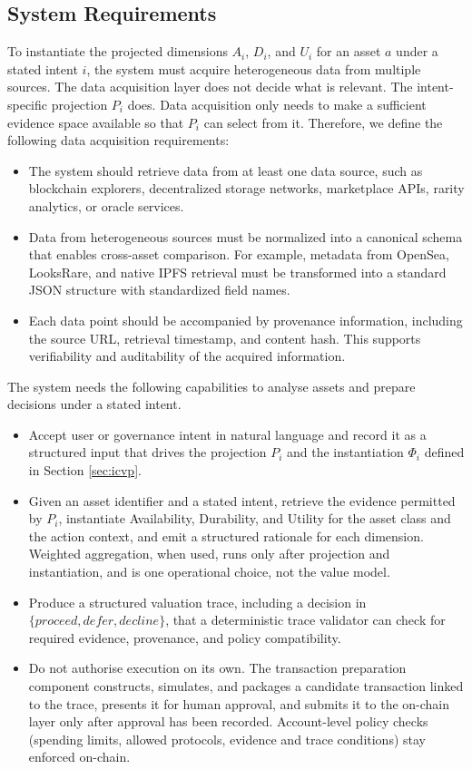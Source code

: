 \subsection{System Requirements}


To instantiate the projected dimensions $A_i$, $D_i$, and $U_i$ for an asset $a$ under a stated intent $i$, the system must acquire heterogeneous data from multiple sources. The data acquisition layer does not decide what is relevant. The intent-specific projection $P_i$ does. Data acquisition only needs to make a sufficient evidence space available so that $P_i$ can select from it. Therefore, we define the following data acquisition requirements:

\begin{itemize}
    \item The system should retrieve data from at least one data source, such as blockchain explorers, decentralized storage networks, marketplace APIs, rarity analytics, or oracle services.
    \item Data from heterogeneous sources must be normalized into a canonical schema that enables cross-asset comparison. For example, metadata from OpenSea, LooksRare, and native IPFS retrieval must be transformed into a standard JSON structure with standardized field names.
    \item Each data point should be accompanied by provenance information, including the source URL, retrieval timestamp, and content hash. This supports verifiability and auditability of the acquired information.
\end{itemize}

The system needs the following capabilities to analyse assets and prepare decisions under a stated intent.

\begin{itemize}
    \item Accept user or governance intent in natural language and record it as a structured input that drives the projection $P_i$ and the instantiation $\Phi_i$ defined in Section \ref{sec:icvp}.
    \item Given an asset identifier and a stated intent, retrieve the evidence permitted by $P_i$, instantiate Availability, Durability, and Utility for the asset class and the action context, and emit a structured rationale for each dimension. Weighted aggregation, when used, runs only after projection and instantiation, and is one operational choice, not the value model.
    \item Produce a structured valuation trace, including a decision in $\{\textit{proceed}, \textit{defer}, \textit{decline}\}$, that a deterministic trace validator can check for required evidence, provenance, and policy compatibility.
    \item Do not authorise execution on its own. The transaction preparation component constructs, simulates, and packages a candidate transaction linked to the trace, presents it for human approval, and submits it to the on-chain layer only after approval has been recorded. Account-level policy checks (spending limits, allowed protocols, evidence and trace conditions) stay enforced on-chain.
\end{itemize}


